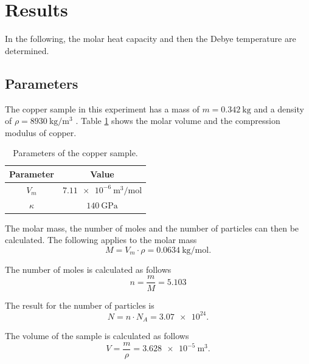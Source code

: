 \section{Results}
\label{sec:results}

In the following, the molar heat capacity and then the Debye temperature are determined.

\subsection{Parameters}
\label{sec:parameters}

The copper sample in this experiment has a mass of $m = \qty{0.342}{\kilo\gram}$ \textnormal{\cite{molar_heat}} and a density of
$ \rho = \qty{8930}{\kilo\gram \per \meter^3 }$ \textnormal{\cite{kupfer}}.
Table \ref{tab:parameters} shows the molar volume and the compression modulus of copper.
\begin{table}[H]
	\centering
	\caption{Parameters of the copper sample.}
	\label{tab:parameters}
	\begin{tabular}{c c }
		\toprule
		Parameter & Value \\
		\midrule
		$V_m$ & $\qty{7.11e-6}{\meter^3 \per \mol}$ \cite{chemie_kupfer}\\
		$\kappa$ & $\qty{140} {\giga\pascal}$ \cite{perioden_kupfer}\\
		\bottomrule
	\end{tabular}
\end{table}

The molar mass, the number of moles and the number of particles can then be calculated.
The following applies to the molar mass
\begin{equation*}
	M = V_m \cdot \rho = \qty{0.0634}{\kilo\gram \per \mol}.
\end{equation*}

The number of moles is calculated as follows
\begin{equation*}
	n = \frac{m}{M} = \num{5.103}
\end{equation*}

The result for the number of particles is
\begin{equation*}
	N = n \cdot N_A = \num{3.07e24}.
\end{equation*}

The volume of the sample is calculated as follows
\begin{equation*}
	V = \frac{m}{\rho} = \qty{3.628e-5}{\meter^3}.
\end{equation*}

